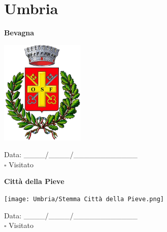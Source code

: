 \documentclass[a5paper,12pt]{article}
\begin{document}
\newpage

\section*{Umbria}

\newpage

\noindent
\begin{minipage}[t]{0.45\textwidth}
    \begin{center}
        \textbf{Bevagna}
    \end{center}
    \vspace{-0.5cm} %
    \begin{center}
        \includegraphics[height= 5cm, width=4cm]{Umbria/Stemma Bevagna.png}
    \end{center}
    \vspace{-0.4cm} %
    \begin{flushleft}
        Data: \_\_\_\_/\_\_\_\_/\_\_\_\_\_\_\_\_\_\_\_\_ \\
        $\square$ Visitato
    \end{flushleft}
\end{minipage}
\hfill
\noindent
\begin{minipage}[t]{0.45\textwidth}
    \begin{center}
        \textbf{Città della Pieve}
    \end{center}
    \vspace{-0.5cm} %
    \begin{center}
        \texttt{[image: Umbria/Stemma Città della Pieve.png]}
    \end{center}
    \vspace{-0.4cm} %
    \begin{flushleft}
        Data: \_\_\_\_/\_\_\_\_/\_\_\_\_\_\_\_\_\_\_\_\_ \\
        $\square$ Visitato
    \end{flushleft}
\end{minipage}
\end{document}
